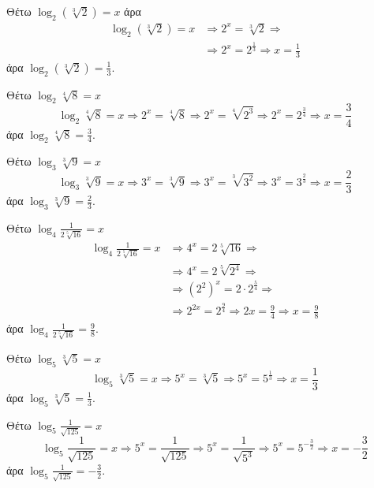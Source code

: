 \begin{alist}
\item Θέτω $ \log_2(\sqrt[3]{2})=x $ άρα
\begin{align*}
\log_2{(\sqrt[3]{2})}=x&\Rightarrow 2^x=\sqrt[3]{2}\Rightarrow\\
&\Rightarrow 2^x=2^{\frac{1}{3}}\Rightarrow x=\frac{1}{3}
\end{align*}
άρα $ \log_2(\sqrt[3]{2})=\frac{1}{3} $.
\item Θέτω $ \log_{2}{\sqrt[4]{8}}=x $
\[ \log_2{\sqrt[4]{8}}=x\Rightarrow 2^x=\sqrt[4]{8}\Rightarrow 2^x=\sqrt[4]{2^3}\Rightarrow 2^x=2^{\frac{3}{4}}\Rightarrow x=\frac{3}{4} \]
άρα $ \log_{2}{\sqrt[4]{8}}=\frac{3}{4} $.
\item Θέτω $ \log_{3}{\sqrt[3]{9}}=x $
\[ \log_{3}{\sqrt[3]{9}}=x\Rightarrow 3^x=\sqrt[3]{9}\Rightarrow 3^x=\sqrt[3]{3^2}\Rightarrow 3^x=3^{\frac{2}{3}}\Rightarrow x=\frac{2}{3} \]
άρα $ \log_{3}{\sqrt[3]{9}}=\frac{2}{3} $.
\item Θέτω $\log_{4}{\frac{1}{2\sqrt[5]{16}}}=x$
\begin{align*}
\log_{4}{\frac{1}{2\sqrt[5]{16}}}=x&\Rightarrow 4^x=2\sqrt[5]{16}\Rightarrow\\
&\Rightarrow 4^x=2\sqrt[5]{2^4}\Rightarrow\\
&\Rightarrow (2^2)^x=2\cdot 2^{\frac{5}{4}}\Rightarrow\\
&\Rightarrow 2^{2x}=2^{\frac{9}{4}}\Rightarrow 2x=\frac{9}{4}\Rightarrow x=\frac{9}{8}
\end{align*}
άρα $ \log_{4}{\frac{1}{2\sqrt[5]{16}}}=\frac{9}{8} $.
\item Θέτω $ \log_{5}{\sqrt[3]{5}}=x $
\[ \log_{5}{\sqrt[3]{5}}=x\Rightarrow 5^x=\sqrt[3]{5}\Rightarrow 5^x=5^{\frac{1}{3}}\Rightarrow x=\frac{1}{3} \]
άρα $ \log_{5}{\sqrt[3]{5}}=\frac{1}{3} $.
\item Θέτω $ \log_{5}{\frac{1}{\sqrt{125}}}=x $
\[ \log_{5}{\frac{1}{\sqrt{125}}}=x\Rightarrow 5^x=\frac{1}{\sqrt{125}}\Rightarrow 5^x=\frac{1}{\sqrt{5^3}}\Rightarrow 5^x=5^{-\frac{3}{2}}\Rightarrow x=-\frac{3}{2} \]
άρα $ \log_{5}{\frac{1}{\sqrt{125}}}=-\frac{3}{2} $.
\end{alist}
